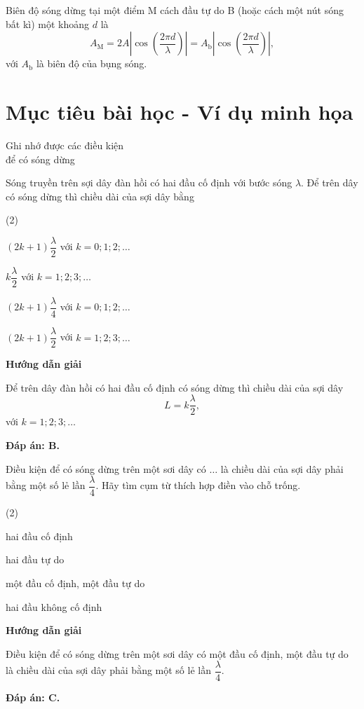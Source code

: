 Biên độ sóng dừng tại một điểm M cách đầu tự do B (hoặc cách một nút sóng bất kì) một khoảng $d$ là
\begin{equation*}
	A_\text{M}=2A\left|\cos\left( \dfrac{2\pi d}{\lambda}\right)\right| = A_\text{b}\left|\cos\left( \dfrac{2\pi d}{\lambda}\right)\right|,
\end{equation*}
với $A_\text{b}$ là biên độ của bụng sóng.		

\section{Mục tiêu bài học - Ví dụ minh họa}
\begin{dang}{Ghi nhớ được các điều kiện\\ để có sóng dừng}
	{Sóng truyền trên sợi dây đàn hồi có hai đầu cố định với bước sóng $\lambda$. Để trên dây có sóng dừng thì chiều dài của sợi dây bằng
		\begin{mcq}(2)
			\item $(2k+1)\dfrac{\lambda}{2}$ với $k=0; 1; 2; \ldots$
			\item $k \dfrac{\lambda}{2}$ với $k=1; 2;3; \ldots$
			\item $(2k+1) \dfrac{\lambda}{4}$ với $k=0; 1; 2; \ldots$
			\item $(2k+1)\dfrac{\lambda}{2}$ với $k=1; 2; 3; \ldots$
		\end{mcq}
	}
	{
		\begin{center}
			\textbf{Hướng dẫn giải}
		\end{center}
		
		Để trên dây đàn hồi có hai đầu cố định có sóng dừng thì chiều dài của sợi dây $$L=k \dfrac{\lambda}{2},$$ với $k=1; 2;3; \ldots$
		
		\textbf{Đáp án: B.}
	}
	{Điều kiện để có sóng dừng trên một sơi dây có $\ldots$ là chiều dài của sợi dây phải bằng một số lẻ lần $\dfrac{\lambda}{4}$. Hãy tìm cụm từ thích hợp điền vào chỗ trống.
		
		\begin{mcq}(2)
			\item hai đầu cố định
			\item hai đầu tự do
			\item một đầu cố định, một đầu tự do
			\item hai đầu không cố định
		\end{mcq}
	}
	{\begin{center}
			\textbf{Hướng dẫn giải}
		\end{center}
		
		Điều kiện để có sóng dừng trên một sơi dây có một đầu cố định, một đầu tự do là chiều dài của sợi dây phải bằng một số lẻ lần $\dfrac{\lambda}{4}$.
		
		\textbf{Đáp án: C.}
	}
\end{dang}
